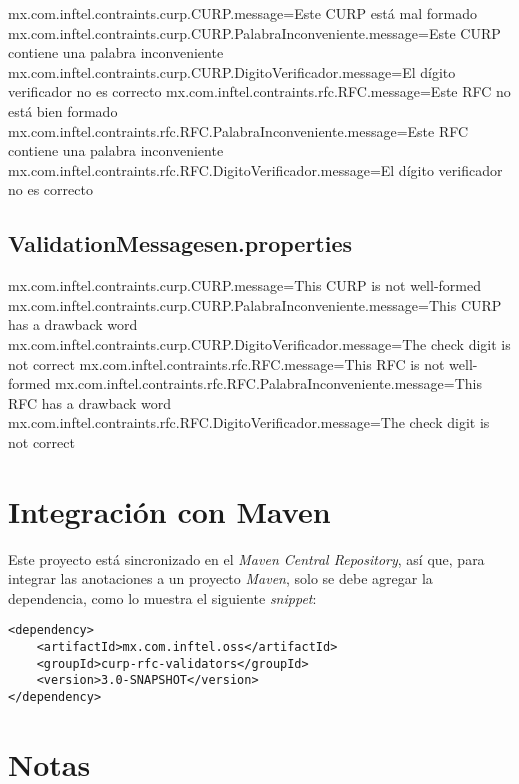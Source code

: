 \documentclass[12pt,letterpaper]{article}
\begin{document}
\scriptsize
\begin{listing}{1}
mx.com.inftel.contraints.curp.CURP.message=Este CURP está mal formado
mx.com.inftel.contraints.curp.CURP.PalabraInconveniente.message=Este CURP contiene una palabra inconveniente
mx.com.inftel.contraints.curp.CURP.DigitoVerificador.message=El dígito verificador no es correcto
mx.com.inftel.contraints.rfc.RFC.message=Este RFC no está bien formado
mx.com.inftel.contraints.rfc.RFC.PalabraInconveniente.message=Este RFC contiene una palabra inconveniente
mx.com.inftel.contraints.rfc.RFC.DigitoVerificador.message=El dígito verificador no es correcto
\end{listing}
\normalsize

\subsection{ValidationMessages\textunderscore{}en.properties}

\scriptsize
\begin{listing}{1}
mx.com.inftel.contraints.curp.CURP.message=This CURP is not well-formed
mx.com.inftel.contraints.curp.CURP.PalabraInconveniente.message=This CURP has a drawback word
mx.com.inftel.contraints.curp.CURP.DigitoVerificador.message=The check digit is not correct
mx.com.inftel.contraints.rfc.RFC.message=This RFC is not well-formed
mx.com.inftel.contraints.rfc.RFC.PalabraInconveniente.message=This RFC has a drawback word
mx.com.inftel.contraints.rfc.RFC.DigitoVerificador.message=The check digit is not correct
\end{listing}
\normalsize

\section{Integración con Maven}

Este proyecto está sincronizado en el \emph{Maven Central Repository}, así que,
para integrar las anotaciones a un proyecto \emph{Maven}, solo se debe agregar
la dependencia, como lo muestra el siguiente \emph{snippet}:

\begin{verbatim}
<dependency>
    <artifactId>mx.com.inftel.oss</artifactId>
    <groupId>curp-rfc-validators</groupId>
    <version>3.0-SNAPSHOT</version>
</dependency>
\end{verbatim}

\section{Notas}
\end{document}
